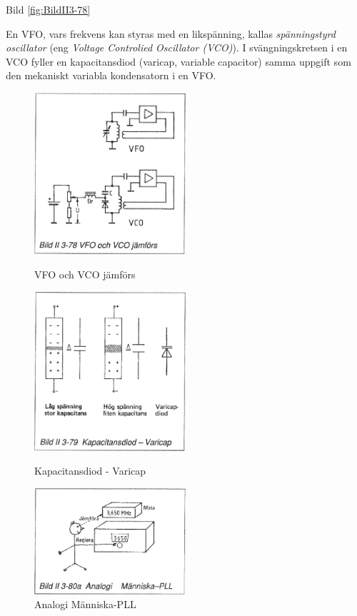 Bild \ref{fig:BildII3-78}

En VFO, vars frekvens kan styras med en likspänning, kallas
\emph{spänningstyrd oscillator} (eng \emph{Voltage Controlied Oscillator
(VCO)}). I svängningskretsen i en VCO fyller en kapacitansdiod (varicap,
variable capacitor) samma uppgift som den mekaniskt variabla kondensatorn i en
VFO.

\begin{figure}
  \includegraphics[width=0.5\textwidth]{images/bild_2_3-78}
  \caption{VFO och VCO jämförs}
  \label{fig:BildII3-78}

  \includegraphics[width=0.5\textwidth]{images/bild_2_3-79}
  \caption{Kapacitansdiod - Varicap}
  \label{fig:BildII3-79}

  \includegraphics[width=0.5\textwidth]{images/bild_2_3-80a}
  \caption{Analogi Människa-PLL}
  \label{fig:BildII3-80a}
\end{figure}

